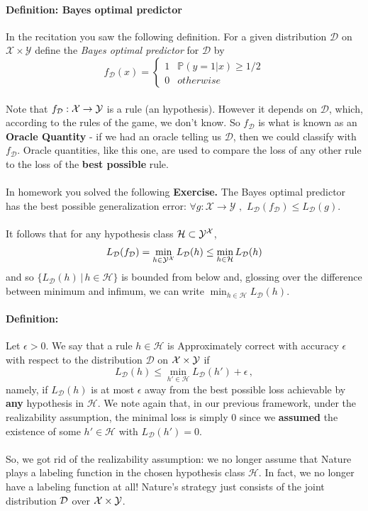 \documentclass[11pt]{article}
\newcommand{\Prob}{\ensuremath{\mathbb{P}}}
\newcommand{\Dc}{\mathcal{D}}
\newcommand{\Xc}{\mathcal{X}}
\newcommand{\Yc}{\mathcal{Y}}
\newcommand{\Hc}{\mathcal{H}}
\begin{document}
\paragraph{Definition: Bayes optimal predictor}
In the recitation you saw the following definition.
    For a given distribution $\Dc$ on $\Xc\times \Yc$ define the {\em Bayes
    optimal predictor} for $\Dc$ by 
    \[
        f_\Dc(x) = 
        \begin{cases}
            1 & \Prob(y=1|x)\geq 1/2\\
            0 & otherwise
        \end{cases}
    \]
~\\
Note that $f_\Dc:\X\to\Y$ is a rule (an hypothesis). However it depends on
$\Dc$, which, according to the rules of the game, we don't know. So $f_\Dc$ is
what is known as an {\bf Oracle Quantity} - if we had an oracle telling us
$\Dc$, then we could classify with $f_\Dc$. Oracle quantities, like this one,
are used to compare the loss of any other rule to the loss of the {\bf best
possible} rule. 
\\~\\
In homework you solved the following
{\bf Exercise.} The Bayes optimal predictor has the best possible generalization
error: 
$ \forall g:\Xc\to\Yc  \,\,,\,\, L_\Dc(f_\Dc)\leq L_\Dc(g) $. 
\\~\\
It follows that for any hypothesis class $\Hc\subset \Y^\X$,
\[
  L_\Dc(f_\Dc) = \min_{h\in \Y^\X} L_\Dc(h)  \leq \min_{h\in\Hc} L_\Dc(h)
\]
and so  $\{L_\Dc(h)\,|\, h\in\Hc\}$ is bounded from below and, glossing over the
difference between minimum and infimum, we can write $\min_{h\in\Hc} L_\Dc(h)$.
~\\
\paragraph{Definition:}
Let $\epsilon>0$.
We say that a rule $h\in\Hc$ is Approximately correct with accuracy $\epsilon$
with respect to the distribution $\Dc$ on $\mathcal{X}\times \mathcal{Y}$ if 
\[
   L_\Dc(h) \leq  \min_{h'\in\Hc} L_\Dc(h') + \epsilon\,,
\]
namely, if $L_\Dc(h)$  is at most $\epsilon$ away from the best possible loss
achievable by {\bf any} hypothesis in $\Hc$. We note again that, in our previous
framework, under the
realizability assumption, the minimal loss is simply $0$ since we {\bf assumed}
the existence of some $h'\in\Hc$ with $L_\Dc(h')=0$.
\\~\\
So, we got rid of the realizability assumption: we no longer assume that Nature
plays a labeling function in the chosen hypothesis class $\Hc$. In fact, we no
longer have a labeling function at all! Nature's strategy just consists of the joint
distribution $\mathcal{D}$ over $\mathcal{X}\times \mathcal{Y}$.
\end{document}
